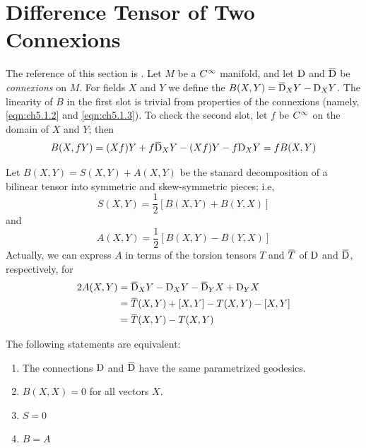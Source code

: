 \documentclass[../main]{subfiles}
\begin{document}
\section{Difference Tensor of Two Connexions}\label{ch05:s4}

The reference of this section is \cite{ambrose1960sprays}. Let $M$ be a $C^\infty$ manifold, and let $\mathrm{D}$ and $\covariant$ be \emph{connexions} on $M$. For fields $X$ and $Y$ we define the  $B(X,Y)=\covariant_X Y - \connection_X Y $. The linearity of $B$ in the first slot is trivial from properties of the connexions (namely, \ref{eqn:ch5.1.2} and \ref{eqn:ch5.1.3}). To check the second slot, let $f$ be $C^\infty$ on the domain of $X$ and $Y$; then \[B(X,fY) = (Xf)Y+f\covariant_XY-(Xf)Y -f\connection_X Y = f B(X,Y)\]

Let $B(X,Y)= S(X,Y)+A(X,Y)$ be the stanard decomposition of a bilinear tensor into symmetric and skew-symmetric pieces; i.e,
\[S(X,Y) = \dfrac{1}{2} [B(X,Y)+B(Y,X)]\]
and
\[A(X,Y) = \dfrac{1}{2} [B(X,Y)-B(Y,X)]\]
Actually, we can express $A$ in terms of the torsion tensors $T$ and $\xoverline{T}$ of $\mathrm{D}$ and $\covariant$, respectively, for 
\begin{align*}
    2A(X,Y) &= \covariant_XY-\connection_XY-\covariant_YX+\connection_YX \\
            &= \xoverline{T}(X,Y) +[X,Y] -T(X,Y)-[X,Y]\\
            &= \xoverline{T}(X,Y) - T(X,Y)
\end{align*}



\begin{theorem} \label{thm:ch5.4.1}
The following statements are equivalent:
\begin{enumerate}[label = (\alph*)]
    \item The connections $\mathrm{D}$ and $\covariant$ have the same parametrized geodesics.
    \item $B(X,X)=0$ for all vectors $X$.
    \item $S=0$
    \item $B=A$
\end{enumerate}
\end{theorem}
\end{document}

